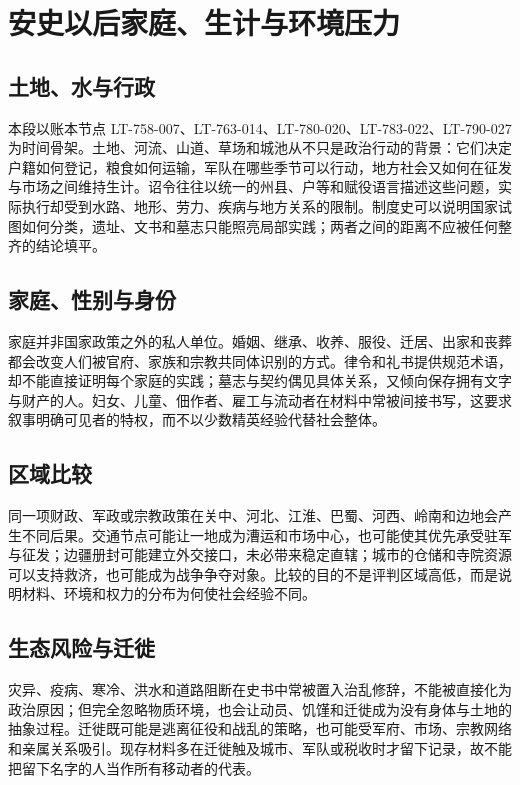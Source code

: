 \section{安史以后家庭、生计与环境压力}
\label{sec:post-an-shi-households-environment}

\subsection{土地、水与行政}
本段以账本节点 LT-758-007、LT-763-014、LT-780-020、LT-783-022、LT-790-027 为时间骨架。土地、河流、山道、草场和城池从不只是政治行动的背景：它们决定户籍如何登记，粮食如何运输，军队在哪些季节可以行动，地方社会又如何在征发与市场之间维持生计。诏令往往以统一的州县、户等和赋役语言描述这些问题，实际执行却受到水路、地形、劳力、疾病与地方关系的限制。制度史可以说明国家试图如何分类，遗址、文书和墓志只能照亮局部实践；两者之间的距离不应被任何整齐的结论填平。

\subsection{家庭、性别与身份}
家庭并非国家政策之外的私人单位。婚姻、继承、收养、服役、迁居、出家和丧葬都会改变人们被官府、家族和宗教共同体识别的方式。律令和礼书提供规范术语，却不能直接证明每个家庭的实践；墓志与契约偶见具体关系，又倾向保存拥有文字与财产的人。妇女、儿童、佃作者、雇工与流动者在材料中常被间接书写，这要求叙事明确可见者的特权，而不以少数精英经验代替社会整体。

\subsection{区域比较}
同一项财政、军政或宗教政策在关中、河北、江淮、巴蜀、河西、岭南和边地会产生不同后果。交通节点可能让一地成为漕运和市场中心，也可能使其优先承受驻军与征发；边疆册封可能建立外交接口，未必带来稳定直辖；城市的仓储和寺院资源可以支持救济，也可能成为战争争夺对象。比较的目的不是评判区域高低，而是说明材料、环境和权力的分布为何使社会经验不同。

\subsection{生态风险与迁徙}
灾异、疫病、寒冷、洪水和道路阻断在史书中常被置入治乱修辞，不能被直接化为政治原因；但完全忽略物质环境，也会让动员、饥馑和迁徙成为没有身体与土地的抽象过程。迁徙既可能是逃离征役和战乱的策略，也可能受军府、市场、宗教网络和亲属关系吸引。现存材料多在迁徙触及城市、军队或税收时才留下记录，故不能把留下名字的人当作所有移动者的代表。

